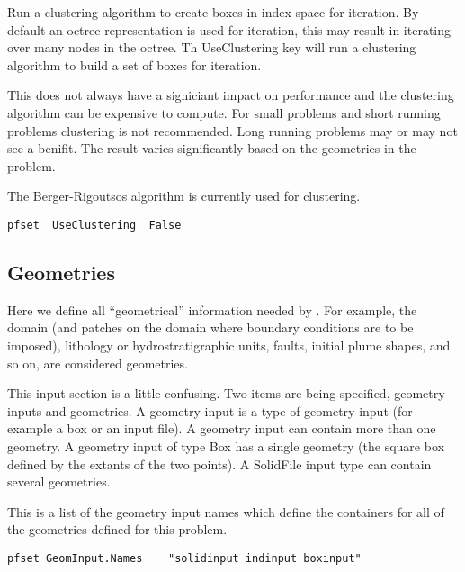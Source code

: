 {
Run a clustering algorithm to create boxes in index space for
iteration. By default an octree representation is used for iteration,
this may result in iterating over many nodes in the octree.
Th UseClustering key will run a clustering algorithm to build a set of boxes
for iteration.

This does not always have a signiciant impact on performance and the
clustering algorithm can be expensive to compute.  For small problems
and short running problems clustering is not recommended.  Long
running problems may or may not see a benifit.  The result varies
significantly based on the geometries in the problem.

The Berger-Rigoutsos algorithm is currently used for clustering.
}
\begin{display}\begin{verbatim}
pfset  UseClustering  False
\end{verbatim}\end{display}

\subsection{Geometries}
\label{Geometries}

Here we define all ``geometrical'' information needed by \parflow{}.
For example, the domain (and patches on the domain where boundary
conditions are to be imposed), lithology or hydrostratigraphic units,
faults, initial plume shapes, and so on, are considered geometries.

This input section is a little confusing.  Two items are being
specified, geometry inputs and geometries.  A geometry input is a type
of geometry input (for example a box or an input file).  A geometry input
can contain more than one geometry.  A geometry input of type Box
has a single geometry (the square box defined by the extants of the
two points).  A SolidFile input type can contain several geometries.

{
This is a list of the geometry input names which define the containers
for all of the geometries defined for this problem.
}
\begin{display}\begin{verbatim}
pfset GeomInput.Names    "solidinput indinput boxinput"
\end{verbatim}\end{display}

